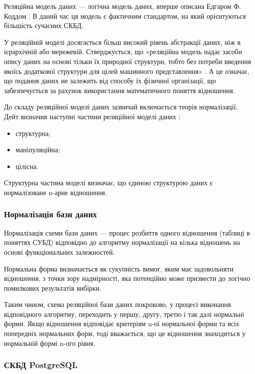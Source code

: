 Реляційна модель даних — логічна модель даних, вперше описана Едгаром Ф. Коддом \cite{codd1970relational}. В даний час ця модель є фактичним стандартом, на який орієнтуються більшість сучасних СКБД.

У реляційній моделі досягається більш високий рівень абстракції даних, ніж в ієрархічній або мережевій. Стверджується, що «реляційна модель надає засоби опису даних на основі тільки їх природної структури, тобто без потреби введення якоїсь додаткової структури для цілей машинного представлення» \cite{codd1970relational}. А це означає, що подання даних не залежить від способу їх фізичної організації, що забезпечується за рахунок використання математичного поняття відношення.

До складу реляційної моделі даних зазвичай включається теорія нормалізації. Дейт визначив наступні частини реляційної моделі даних \cite{дейт2008введение}:
\begin{itemize}
	\item структурна;
	\item маніпуляційна;
	\item цілісна.
\end{itemize}

Структурна частина моделі визначає, що єдиною структурою даних є нормалізоване n-арне відношення.

\subsubsection{Нормалізація бази даних}

Нормалізація схеми бази даних — процес розбиття одного відношення (таблиці в поняттях СУБД) відповідно до алгоритму нормалізації на кілька відношень на основі функціональних залежностей.

Нормальна форма визначається як сукупність вимог, яким має задовольняти відношення, з точки зору надмірності, яка потенційно може призвести до логічно помилкових результатів вибірки.

Таким чином, схема реляційної бази даних покроково, у процесі виконання відповідного алгоритму, переходить у першу, другу, третю і так далі нормальні форми. Якщо відношення відповідає критеріям n-ої нормальної форми та всіх попередніх нормальних форм, тоді вважається, що це відношення знаходиться у нормальній формі n-ого рівня.

\subsubsection{СКБД PostgreSQL}

